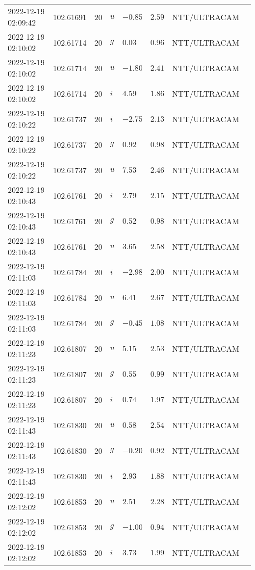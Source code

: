 \documentclass{nature_plusfigure}
\begin{document}
\begin{supplement}
\begin{center}
\begin{longtable}{llllllll}
2022-12-19 02:09:42 & 102.61691 & 20 & $u$ & $-0.85$ & $2.59$ & NTT/ULTRACAM &  \\ 
2022-12-19 02:10:02 & 102.61714 & 20 & $g$ & $0.03$ & $0.96$ & NTT/ULTRACAM &  \\ 
2022-12-19 02:10:02 & 102.61714 & 20 & $u$ & $-1.80$ & $2.41$ & NTT/ULTRACAM &  \\ 
2022-12-19 02:10:02 & 102.61714 & 20 & $i$ & $4.59$ & $1.86$ & NTT/ULTRACAM &  \\ 
2022-12-19 02:10:22 & 102.61737 & 20 & $i$ & $-2.75$ & $2.13$ & NTT/ULTRACAM &  \\ 
2022-12-19 02:10:22 & 102.61737 & 20 & $g$ & $0.92$ & $0.98$ & NTT/ULTRACAM &  \\ 
2022-12-19 02:10:22 & 102.61737 & 20 & $u$ & $7.53$ & $2.46$ & NTT/ULTRACAM &  \\ 
2022-12-19 02:10:43 & 102.61761 & 20 & $i$ & $2.79$ & $2.15$ & NTT/ULTRACAM &  \\ 
2022-12-19 02:10:43 & 102.61761 & 20 & $g$ & $0.52$ & $0.98$ & NTT/ULTRACAM &  \\ 
2022-12-19 02:10:43 & 102.61761 & 20 & $u$ & $3.65$ & $2.58$ & NTT/ULTRACAM &  \\ 
2022-12-19 02:11:03 & 102.61784 & 20 & $i$ & $-2.98$ & $2.00$ & NTT/ULTRACAM &  \\ 
2022-12-19 02:11:03 & 102.61784 & 20 & $u$ & $6.41$ & $2.67$ & NTT/ULTRACAM &  \\ 
2022-12-19 02:11:03 & 102.61784 & 20 & $g$ & $-0.45$ & $1.08$ & NTT/ULTRACAM &  \\ 
2022-12-19 02:11:23 & 102.61807 & 20 & $u$ & $5.15$ & $2.53$ & NTT/ULTRACAM &  \\ 
2022-12-19 02:11:23 & 102.61807 & 20 & $g$ & $0.55$ & $0.99$ & NTT/ULTRACAM &  \\ 
2022-12-19 02:11:23 & 102.61807 & 20 & $i$ & $0.74$ & $1.97$ & NTT/ULTRACAM &  \\ 
2022-12-19 02:11:43 & 102.61830 & 20 & $u$ & $0.58$ & $2.54$ & NTT/ULTRACAM &  \\ 
2022-12-19 02:11:43 & 102.61830 & 20 & $g$ & $-0.20$ & $0.92$ & NTT/ULTRACAM &  \\ 
2022-12-19 02:11:43 & 102.61830 & 20 & $i$ & $2.93$ & $1.88$ & NTT/ULTRACAM &  \\ 
2022-12-19 02:12:02 & 102.61853 & 20 & $u$ & $2.51$ & $2.28$ & NTT/ULTRACAM &  \\ 
2022-12-19 02:12:02 & 102.61853 & 20 & $g$ & $-1.00$ & $0.94$ & NTT/ULTRACAM &  \\ 
2022-12-19 02:12:02 & 102.61853 & 20 & $i$ & $3.73$ & $1.99$ & NTT/ULTRACAM &  \\ 

\end{longtable}
\end{center}
\end{supplement}
\end{document}
